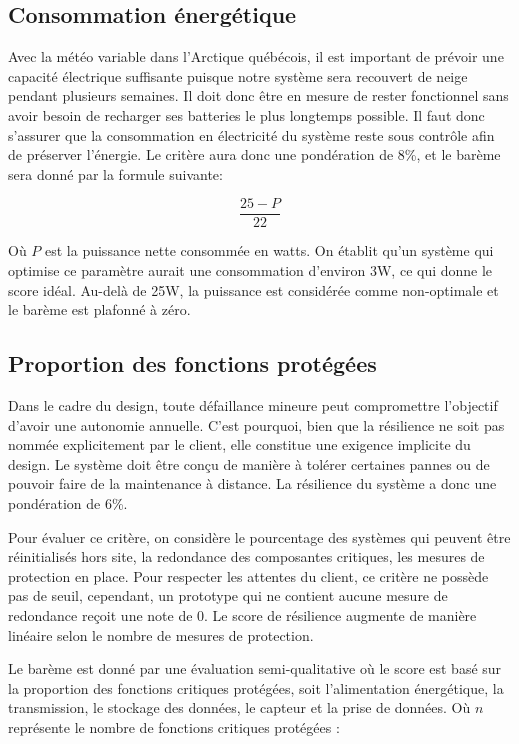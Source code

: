 \subsection{Consommation énergétique}
\label{consommation_electrique}
Avec la météo variable dans l'Arctique québécois, il est important de prévoir une capacité électrique suffisante puisque notre système sera recouvert de neige pendant plusieurs semaines.
Il doit donc être en mesure de rester fonctionnel sans avoir besoin de recharger ses batteries le plus longtemps possible.
Il faut donc s'assurer que la consommation en électricité du système reste sous contrôle afin de préserver l'énergie. 
Le critère aura donc une pondération de 8\%, et le barème sera donné par la formule suivante:

\begin{equation}
    \frac{25-P}{22}
\end{equation}

Où $P$ est la puissance nette consommée en watts.
On établit qu'un système qui optimise ce paramètre aurait une consommation d'environ 3W, ce qui donne le score idéal.
Au-delà de 25W, la puissance est considérée comme non-optimale et le barème est plafonné à zéro.

\subsection{Proportion des fonctions protégées}
\label{resilience_systeme}
Dans le cadre du design, toute défaillance mineure peut compromettre l’objectif d’avoir une autonomie annuelle. C’est pourquoi, bien que la résilience ne soit pas nommée explicitement par le client, elle constitue une exigence implicite du design. Le système doit être conçu de manière à tolérer certaines pannes ou de pouvoir faire de la maintenance à distance. La résilience du système a donc une pondération de 6\%. 
\bigskip

Pour évaluer ce critère, on considère le pourcentage des systèmes qui peuvent être réinitialisés hors site, la redondance des composantes critiques, les mesures de protection en place. Pour respecter les attentes du client, ce critère ne possède pas de seuil, cependant, un prototype qui ne contient aucune mesure de redondance reçoit une note de 0. Le score de résilience augmente de manière linéaire selon le nombre de mesures de protection. 
\bigskip

Le barème est donné par une évaluation semi-qualitative où le score est basé sur la proportion des fonctions critiques protégées, soit l’alimentation énergétique, la transmission, le stockage des données, le capteur et la prise de données. Où $n$ représente le nombre de fonctions critiques protégées :

